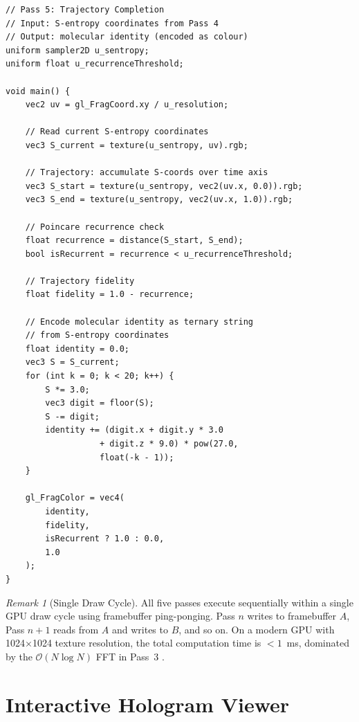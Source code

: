 \documentclass[11pt,a4paper]{article}
\theoremstyle{definition}
\theoremstyle{remark}
\newtheorem{remark}[theorem]{Remark}
\begin{document}
\begin{lstlisting}[style=glsl, caption={Pass 5: Trajectory completion shader}, label={lst:pass5}]
// Pass 5: Trajectory Completion
// Input: S-entropy coordinates from Pass 4
// Output: molecular identity (encoded as colour)
uniform sampler2D u_sentropy;
uniform float u_recurrenceThreshold;

void main() {
    vec2 uv = gl_FragCoord.xy / u_resolution;

    // Read current S-entropy coordinates
    vec3 S_current = texture(u_sentropy, uv).rgb;

    // Trajectory: accumulate S-coords over time axis
    vec3 S_start = texture(u_sentropy, vec2(uv.x, 0.0)).rgb;
    vec3 S_end = texture(u_sentropy, vec2(uv.x, 1.0)).rgb;

    // Poincare recurrence check
    float recurrence = distance(S_start, S_end);
    bool isRecurrent = recurrence < u_recurrenceThreshold;

    // Trajectory fidelity
    float fidelity = 1.0 - recurrence;

    // Encode molecular identity as ternary string
    // from S-entropy coordinates
    float identity = 0.0;
    vec3 S = S_current;
    for (int k = 0; k < 20; k++) {
        S *= 3.0;
        vec3 digit = floor(S);
        S -= digit;
        identity += (digit.x + digit.y * 3.0
                   + digit.z * 9.0) * pow(27.0,
                   float(-k - 1));
    }

    gl_FragColor = vec4(
        identity,
        fidelity,
        isRecurrent ? 1.0 : 0.0,
        1.0
    );
}
\end{lstlisting}

\begin{remark}[Single Draw Cycle]
All five passes execute sequentially within a single GPU draw cycle using framebuffer ping-ponging. Pass $n$ writes to framebuffer $A$, Pass $n+1$ reads from $A$ and writes to $B$, and so on. On a modern GPU with 1024$\times$1024 texture resolution, the total computation time is $< 1$~ms, dominated by the $\mathcal{O}(N \log N)$ FFT in Pass~3 \citep{cooleytukey1965}.
\end{remark}

\section{Interactive Hologram Viewer}
\label{sec:viewer}
\end{document}
